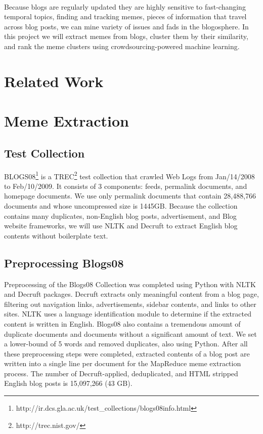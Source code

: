 \documentclass{sig-alternate}
\begin{document}
\\Because blogs are regularly updated they are highly sensitive to fast-changing temporal topics, finding and tracking memes, pieces of information that travel across blog posts, we can mine variety of issues and fads in the blogosphere. In this project we will extract memes from blogs, cluster them by their similarity, and rank the meme clusters using crowdsourcing-powered machine learning.

\section{Related Work}


\section{Meme Extraction}

\subsection{Test Collection}

BLOGS08\footnote{http://ir.dcs.gla.ac.uk/test\_collections/blogs08info.html} is a TREC\footnote{http://trec.nist.gov/} test collection that crawled Web Logs from Jan/14/2008 to Feb/10/2009. It consists of 3 components: feeds, permalink documents, and homepage documents. We use only permalink documents that contain 28,488,766 documents and whose uncompressed size is 1445GB. Because the collection contains many duplicates, non-English blog posts, advertisement, and Blog website frameworks, we will use NLTK and Decruft to extract English blog contents without boilerplate text.

\subsection{Preprocessing Blogs08}

Preprocessing of the Blogs08 Collection was completed using Python with NLTK and Decruft packages. Decruft extracts only meaningful content from a blog page, filtering out navigation links, advertisements, sidebar contents, and links to other sites. NLTK uses a language identification module to determine if the extracted content is written in English. Blogs08 also contains a tremendous amount of duplicate documents and documents without a significant amount of text. We set a lower-bound of 5 words and removed duplicates, also using Python. After all these preprocessing steps were completed, extracted contents of a blog post are written into a single line per document for the MapReduce meme extraction process. The number of Decruft-applied, deduplicated, and HTML stripped English blog posts is 15,097,266 (43 GB).
\end{document}
